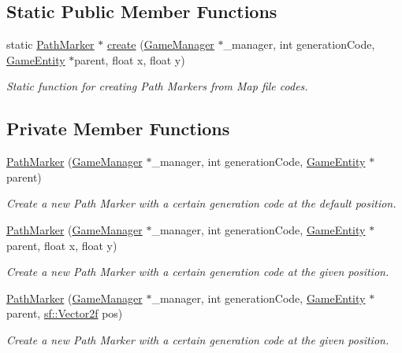 \subsection*{Static Public Member Functions}
\begin{DoxyCompactItemize}
\item 
static \mbox{\hyperlink{class_path_marker}{Path\+Marker}} $\ast$ \mbox{\hyperlink{class_path_marker_a94f5904dbb1b63290bb700312201e698}{create}} (\mbox{\hyperlink{class_game_manager}{Game\+Manager}} $\ast$\+\_\+manager, int generation\+Code, \mbox{\hyperlink{class_game_entity}{Game\+Entity}} $\ast$parent, float x, float y)
\begin{DoxyCompactList}\small\item\em Static function for creating Path Markers from Map file codes. \end{DoxyCompactList}\end{DoxyCompactItemize}
\subsection*{Private Member Functions}
\begin{DoxyCompactItemize}
\item 
\mbox{\hyperlink{class_path_marker_a99f9729d5c1377a57e3266e3ab1c0ac9}{Path\+Marker}} (\mbox{\hyperlink{class_game_manager}{Game\+Manager}} $\ast$\+\_\+manager, int generation\+Code, \mbox{\hyperlink{class_game_entity}{Game\+Entity}} $\ast$parent)
\begin{DoxyCompactList}\small\item\em Create a new Path Marker with a certain generation code at the default position. \end{DoxyCompactList}\item 
\mbox{\hyperlink{class_path_marker_ae1bd502fd20fff6f8bbc74cbe79352ad}{Path\+Marker}} (\mbox{\hyperlink{class_game_manager}{Game\+Manager}} $\ast$\+\_\+manager, int generation\+Code, \mbox{\hyperlink{class_game_entity}{Game\+Entity}} $\ast$parent, float x, float y)
\begin{DoxyCompactList}\small\item\em Create a new Path Marker with a certain generation code at the given position. \end{DoxyCompactList}\item 
\mbox{\hyperlink{class_path_marker_aad21fc14d9b53cdb06f1c8ed76cc0e07}{Path\+Marker}} (\mbox{\hyperlink{class_game_manager}{Game\+Manager}} $\ast$\+\_\+manager, int generation\+Code, \mbox{\hyperlink{class_game_entity}{Game\+Entity}} $\ast$parent, \mbox{\hyperlink{classsf_1_1_vector2}{sf\+::\+Vector2f}} pos)
\begin{DoxyCompactList}\small\item\em Create a new Path Marker with a certain generation code at the given position. \end{DoxyCompactList}\end{DoxyCompactItemize}
